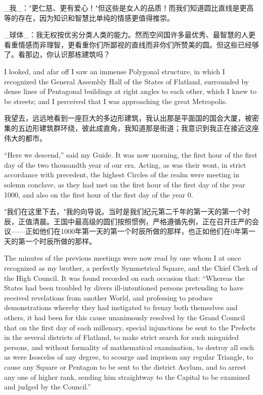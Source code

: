 \documentclass[12pt,UTF8]{ctexbook}
\begin{document}
\_我\_："更仁慈、更有爱心！"但这些是女人的品质！而我们知道圆比直线是更高等的存在，因为知识和智慧比单纯的情感更值得推崇。

\_球体\_：我无权按优劣分类人类的能力。然而空间国许多最优秀、最智慧的人更看重情感而非理智，更看重你们所鄙视的直线而非你们所赞美的圆。但这些已经够了。看那边，你认识那栋建筑吗？

I looked, and afar off I saw an immense Polygonal structure, in which I recognized the General Assembly Hall of the States of Flatland, surrounded by dense lines of Pentagonal buildings at right angles to each other, which I knew to be streets; and I perceived that I was approaching the great Metropolis.

我望去，远远地看到一座巨大的多边形建筑，我认出那是平面国的国会大厦，被密集的五边形建筑群环绕，彼此成直角，我知道那是街道；我意识到我正在接近这座伟大的都市。

``Here we descend,'' said my Guide. It was now morning, the first hour of the first day of the two thousandth year of our era. Acting, as was their wont, in strict accordance with precedent, the highest Circles of the realm were meeting in solemn conclave, as they had met on the first hour of the first day of the year 1000, and also on the first hour of the first day of the year 0.

"我们在这里下去，"我的向导说。当时是我们纪元第二千年的第一天的第一个时辰，正值清晨。王国中最高级的圆们按照惯例，严格遵循先例，正在召开庄严的会议——正如他们在1000年第一天的第一个时辰所做的那样，也正如他们在0年第一天的第一个时辰所做的那样。

The minutes of the previous meetings were now read by one whom I at once recognized as my brother, a perfectly Symmetrical Square, and the Chief Clerk of the High Council. It was found recorded on each occasion that: ``Whereas the States had been troubled by divers ill-intentioned persons pretending to have received revelations from another World, and professing to produce demonstrations whereby they had instigated to frenzy both themselves and others, it had been for this cause unanimously resolved by the Grand Council that on the first day of each millenary, special injunctions be sent to the Prefects in the several districts of Flatland, to make strict search for such misguided persons, and without formality of mathematical examination, to destroy all such as were Isosceles of any degree, to scourge and imprison any regular Triangle, to cause any Square or Pentagon to be sent to the district Asylum, and to arrest any one of higher rank, sending him straightway to the Capital to be examined and judged by the Council.''
\end{document}
